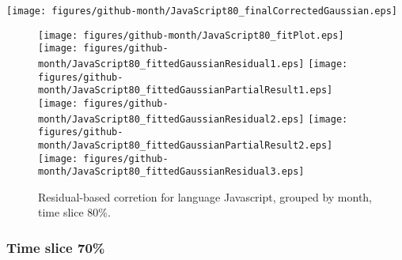 \begin{center}
{\texttt{[image: figures/github-month/JavaScript80\_finalCorrectedGaussian.eps]}}
\end{center}

\FloatBarrier

\begin{figure}[t]
\centering
{}
{\texttt{[image: figures/github-month/JavaScript80\_fitPlot.eps]}}
{\texttt{[image: figures/github-month/JavaScript80\_fittedGaussianResidual1.eps]}}
{\texttt{[image: figures/github-month/JavaScript80\_fittedGaussianPartialResult1.eps]}}
{\texttt{[image: figures/github-month/JavaScript80\_fittedGaussianResidual2.eps]}}
{\texttt{[image: figures/github-month/JavaScript80\_fittedGaussianPartialResult2.eps]}}
{\texttt{[image: figures/github-month/JavaScript80\_fittedGaussianResidual3.eps]}}
\caption{Residual-based corretion for language Javascript, grouped by month, time slice 80\%.}
\end{figure}


\FloatBarrier


\subsubsection{Time slice 70\%}

